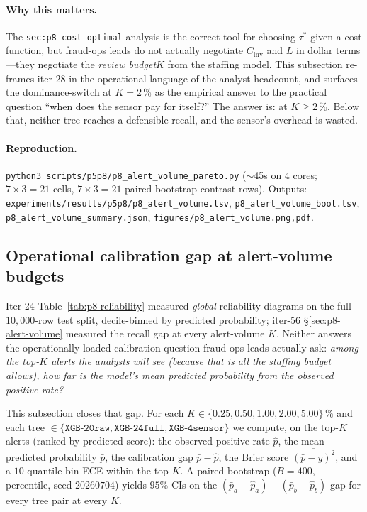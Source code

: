 \documentclass{article}
\providecommand{\tableref}[1]{Table~\ref{#1}}
\begin{document}
\paragraph{Why this matters.}
The \texttt{sec:p8-cost-optimal} analysis is the correct tool for choosing
$\tau^{*}$ given a cost function, but fraud-ops leads do not actually
negotiate $C_{\text{inv}}$ and $L$ in dollar terms---they negotiate the
\emph{review budget}$K$ from the staffing model. This subsection
re-frames iter-28 in the operational language of the analyst headcount,
and surfaces the dominance-switch at $K{=}2\,\%$ as the empirical answer
to the practical question ``when does the sensor pay for itself?''
The answer is: at $K{\ge}2\,\%$. Below that, neither tree reaches a
defensible recall, and the sensor's overhead is wasted.

\paragraph{Reproduction.}
\texttt{python3 scripts/p5p8/p8\_alert\_volume\_pareto.py} ($\sim$45s on 4
cores; $7 \times 3 = 21$ cells, $7 \times 3 = 21$ paired-bootstrap
contrast rows). Outputs:
\texttt{experiments/results/p5p8/p8\_alert\_volume.tsv},
\texttt{p8\_alert\_volume\_boot.tsv},
\texttt{p8\_alert\_volume\_summary.json},
\texttt{figures/p8\_alert\_volume.{png,pdf}}.

\subsection{Operational calibration gap at alert-volume budgets}
\label{sec:p8-operational-calibration}

Iter-24 \tableref{tab:p8-reliability} measured \emph{global} reliability
diagrams on the full $10{,}000$-row test split, decile-binned by predicted
probability; iter-56 \S\ref{sec:p8-alert-volume} measured the recall gap
at every alert-volume $K$. Neither answers the operationally-loaded
calibration question fraud-ops leads actually ask: \emph{among the
top-$K$ alerts the analysts will see (because that is all the staffing
budget allows), how far is the model's mean predicted probability from
the observed positive rate?}

This subsection closes that gap. For each $K \in \{0.25, 0.50, 1.00,
2.00, 5.00\}\,\%$ and each tree $\in \{\texttt{XGB-20raw},
\texttt{XGB-24full}, \texttt{XGB-4sensor}\}$ we compute, on the top-$K$
alerts (ranked by predicted score): the observed positive rate $\hat{p}$,
the mean predicted probability $\bar{p}$, the calibration gap
$\bar{p} - \hat{p}$, the Brier score $\overline{(\bar{p} - y)^2}$, and a
$10$-quantile-bin ECE within the top-$K$. A paired bootstrap
($B{=}400$, percentile, seed $20260704$) yields $95\%$ CIs on the
$(\bar{p}_a - \hat{p}_a) - (\bar{p}_b - \hat{p}_b)$ gap for every tree
pair at every $K$.
\end{document}
